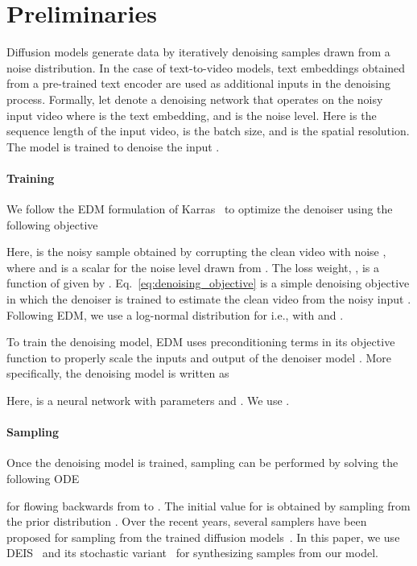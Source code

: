 \documentclass[10pt,twocolumn,letterpaper]{article}
\begin{document}
 \section{Preliminaries}

Diffusion models generate data by iteratively denoising samples drawn from a noise distribution. In the case of text-to-video models, text embeddings obtained from a pre-trained text encoder are used as additional inputs in the denoising process. Formally, let  denote a denoising network that operates on the noisy input video  where  is the text embedding, and  is the noise level. Here  is the sequence length of the input video,  is the batch size, and  is the spatial resolution. The model  is trained to denoise the input . 

\paragraph{Training}
We follow the EDM formulation of Karras~\etal\cite{karras2022elucidating} to optimize the denoiser  using the following objective

Here,  is the noisy sample obtained by corrupting the clean video  with noise , where  and  is a scalar for the noise level drawn from . The loss weight, , is a function of  given by .
Eq.~\eqref{eq:denoising_objective} is a simple denoising objective in which the denoiser  is trained to estimate the clean video  from the noisy input . Following EDM, we use a log-normal distribution for  i.e.,  with  and .


To train the denoising model, EDM uses preconditioning terms in its objective function to properly scale the inputs and output of the denoiser model . More specifically, the denoising model  is written as 

Here,  is a neural network with parameters  and . We use .

\paragraph{Sampling} 
Once the denoising model is trained, sampling can be performed by solving the following ODE~\cite{karras2022elucidating}

for  flowing backwards from  to . The initial value for  is obtained by sampling from the prior distribution . Over the recent years, several samplers have been proposed for sampling from the trained diffusion models~\cite{zhang2023fast, song2021denoising, liu2022pseudo, lu2022dpm, ho2020denoising}. In this paper, we use DEIS~\cite{zhang2023fast} and its stochastic variant~\cite{karras2022elucidating} for synthesizing samples from our model.
\end{document}
